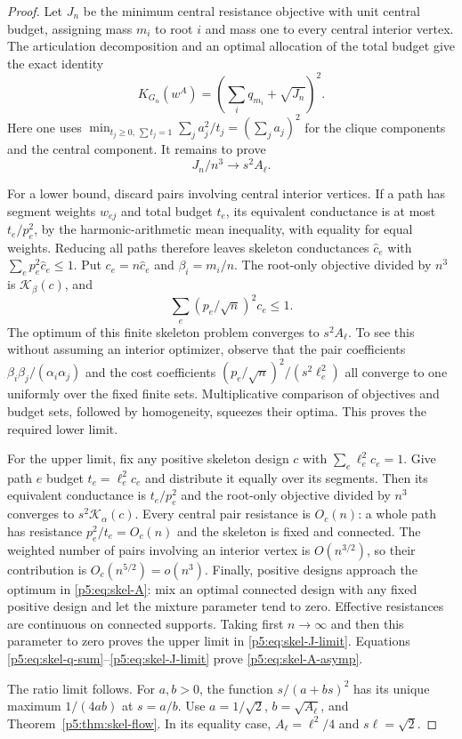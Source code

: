\documentclass[11pt,a4paper]{article}
\theoremstyle{definition}
\theoremstyle{remark}
\numberwithin{equation}{section}
\begin{document}
\begin{proof}
Let $J_n$ be the minimum central resistance objective with
unit central budget, assigning mass $m_i$ to root $i$ and
mass one to every central interior vertex.  The articulation
decomposition and an optimal allocation of the total budget
give the exact identity
\begin{equation}\label{p5:eq:skel-A-decomposition}
 K_{G_n}(w^A)=\left(\sum_i q_{m_i}+\sqrt{J_n}\right)^2.
\end{equation}
Here one uses $\min_{t_j\geq0,\,\sum t_j=1}\sum_j a_j^2/t_j
=(\sum_j a_j)^2$ for the clique components and the central
component.  It remains to prove
\begin{equation}\label{p5:eq:skel-J-limit}
 J_n/n^3\longrightarrow s^2 A_\ell.
\end{equation}

For a lower bound, discard pairs involving central interior
vertices.  If a path has segment weights $w_{ej}$ and total
budget $t_e$, its equivalent conductance is at most $t_e/p_e^2$,
by the harmonic-arithmetic mean inequality, with equality for
equal weights.  Reducing all paths therefore leaves skeleton
conductances $\widehat c_e$ with
$\sum_e p_e^2\widehat c_e\leq1$.  Put
$c_e=n\widehat c_e$ and $\beta_i=m_i/n$.  The root-only
objective divided by $n^3$ is $\mathcal K_\beta(c)$, and
\[
 \sum_e (p_e/\sqrt n)^2c_e\leq1.
\]
The optimum of this finite skeleton problem converges to
$s^2A_\ell$.  To see this without assuming an interior
optimizer, observe that the pair coefficients
$\beta_i\beta_j/(\alpha_i\alpha_j)$ and the cost coefficients
$(p_e/\sqrt n)^2/(s^2\ell_e^2)$ all converge to one uniformly
over the fixed finite sets.  Multiplicative comparison of
objectives and budget sets, followed by homogeneity, squeezes
their optima.  This proves the required lower limit.

For the upper limit, fix any positive skeleton design $c$
with $\sum_e\ell_e^2c_e=1$.  Give path $e$ budget
$t_e=\ell_e^2c_e$ and distribute it equally over its segments.
Then its equivalent conductance is $t_e/p_e^2$ and the
root-only objective divided by $n^3$ converges to
$s^2\mathcal K_\alpha(c)$.  Every central pair resistance
is $O_c(n)$: a whole path has resistance $p_e^2/t_e=O_c(n)$
and the skeleton is fixed and connected.  The weighted
number of pairs involving an interior vertex is
$O(n^{3/2})$, so their contribution is $O_c(n^{5/2})=o(n^3)$.
Finally, positive designs approach the optimum in
\eqref{p5:eq:skel-A}: mix an optimal connected design with any
fixed positive design and let the mixture parameter tend to
zero.  Effective resistances are continuous on connected
supports.  Taking first $n\to\infty$ and then this parameter
to zero proves the upper limit in \eqref{p5:eq:skel-J-limit}.
Equations \eqref{p5:eq:skel-q-sum}--\eqref{p5:eq:skel-J-limit}
prove \eqref{p5:eq:skel-A-asymp}.

The ratio limit follows.  For $a,b>0$, the function
$s/(a+bs)^2$ has its unique maximum $1/(4ab)$ at $s=a/b$.
Use $a=1/\sqrt2$, $b=\sqrt{A_\ell}$, and
Theorem~\ref{p5:thm:skel-flow}.  In its equality case,
$A_\ell=\ell^2/4$ and $s\ell=\sqrt2$.
\end{proof}
\end{document}
